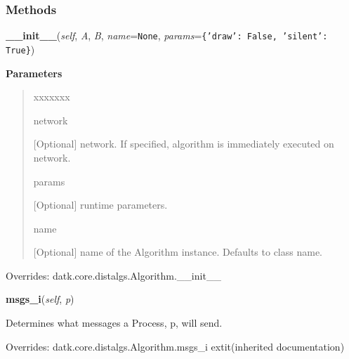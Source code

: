   \subsubsection{Methods}

    \vspace{0.5ex}

\hspace{.8\funcindent}\begin{boxedminipage}{\funcwidth}

    \raggedright \textbf{\_\_init\_\_}(\textit{self}, \textit{A}, \textit{B}, \textit{name}={\tt None}, \textit{params}={\tt \texttt{\{}\texttt{'}\texttt{draw}\texttt{'}\texttt{: }False\texttt{, }\texttt{'}\texttt{silent}\texttt{'}\texttt{: }True\texttt{\}}})

\setlength{\parskip}{2ex}
\setlength{\parskip}{1ex}
      \textbf{Parameters}
      \vspace{-1ex}

      \begin{quote}
        \begin{Ventry}{xxxxxxx}

          \item[network]

          [Optional] network. If specified, algorithm is immediately 
          executed on network.

          \item[params]

          [Optional] runtime parameters.

          \item[name]

          [Optional] name of the Algorithm instance. Defaults to class 
          name.

        \end{Ventry}

      \end{quote}

      Overrides: datk.core.distalgs.Algorithm.\_\_init\_\_

    \end{boxedminipage}

    \vspace{0.5ex}

\hspace{.8\funcindent}\begin{boxedminipage}{\funcwidth}

    \raggedright \textbf{msgs\_i}(\textit{self}, \textit{p})

\setlength{\parskip}{2ex}
    Determines what messages a Process, p, will send.

\setlength{\parskip}{1ex}
      Overrides: datk.core.distalgs.Algorithm.msgs\_i 	extit{(inherited documentation)}

    \end{boxedminipage}

